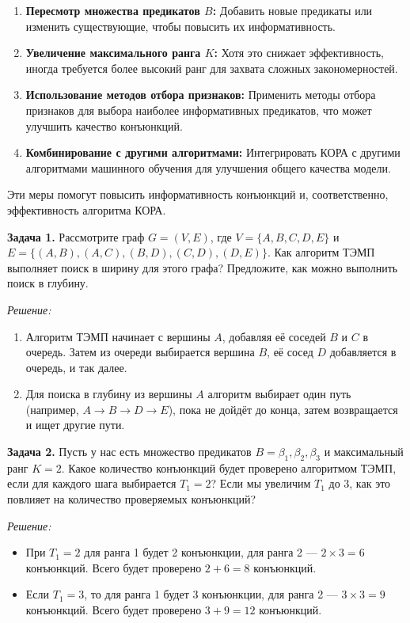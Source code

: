 \begin{enumerate}
    \item \textbf{Пересмотр множества предикатов \( B \):} Добавить новые предикаты или изменить существующие, чтобы повысить их информативность.
    \item \textbf{Увеличение максимального ранга \( K \):} Хотя это снижает эффективность, иногда требуется более высокий ранг для захвата сложных закономерностей.
    \item \textbf{Использование методов отбора признаков:} Применить методы отбора признаков для выбора наиболее информативных предикатов, что может улучшить качество конъюнкций.
    \item \textbf{Комбинирование с другими алгоритмами:} Интегрировать КОРА с другими алгоритмами машинного обучения для улучшения общего качества модели.
\end{enumerate}

Эти меры помогут повысить информативность конъюнкций и, соответственно, эффективность алгоритма КОРА.

\textbf{Задача 1.}
\newline
Рассмотрите граф $G = (V, E)$, где $V = \{A, B, C, D, E\}$ и $E = \{(A, B), (A, C), (B, D), (C, D), (D, E)\}$. Как алгоритм ТЭМП выполняет поиск в ширину для этого графа? Предложите, как можно выполнить поиск в глубину.

\textit{Решение:}
\begin{enumerate}
    \item Алгоритм ТЭМП начинает с вершины $A$, добавляя её соседей $B$ и $C$ в очередь. Затем из очереди выбирается вершина $B$, её сосед $D$ добавляется в очередь, и так далее.
    \item Для поиска в глубину из вершины $A$ алгоритм выбирает один путь (например, $A \to B \to D \to E$), пока не дойдёт до конца, затем возвращается и ищет другие пути.
\end{enumerate}

\textbf{Задача 2.}
\newline
Пусть у нас есть множество предикатов $B = \beta_1, \beta_2, \beta_3$ и максимальный ранг $K = 2$. Какое количество конъюнкций будет проверено алгоритмом ТЭМП, если для каждого шага выбирается $T_1 = 2$? Если мы увеличим $T_1$ до 3, как это повлияет на количество проверяемых конъюнкций?

\textit{Решение:}
\begin{itemize}
    \item При $T_1 = 2$ для ранга 1 будет 2 конъюнкции, для ранга 2 --- $2 \times 3 = 6$ конъюнкций. Всего будет проверено $2 + 6 = 8$ конъюнкций.
    \item Если $T_1 = 3$, то для ранга 1 будет 3 конъюнкции, для ранга 2 --- $3 \times 3 = 9$ конъюнкций. Всего будет проверено $3 + 9 = 12$ конъюнкций.
\end{itemize}

